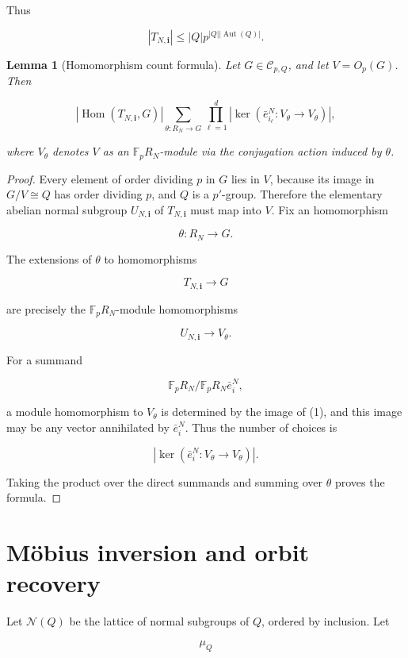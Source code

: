 \documentclass[11pt]{article}
\newtheorem{lemma}[theorem]{Lemma}
\begin{document}
Thus

\[
|T_{N,\mathbf i}|
\le
|Q|p^{|Q||\operatorname{Aut}(Q)|}.
\]

\begin{lemma}[Homomorphism count formula]
Let $G\in\mathcal C_{p,Q}$, and let $V=O_p(G)$. Then

\[
|\operatorname{Hom}(T_{N,\mathbf i},G)|
\sum_{\theta:R_N\to G}
\prod_{\ell=1}^d
\left|
\ker\left(
\bar e_{i_\ell}^N:V_\theta\to V_\theta
\right)
\right|,
\]

where $V_\theta$ denotes $V$ as an $\mathbb F_pR_N$-module via the conjugation action induced by $\theta$.

\end{lemma}

\begin{proof}
Every element of order dividing $p$ in $G$ lies in $V$, because its image in $G/V\cong Q$ has order dividing $p$, and $Q$ is a $p'$-group. Therefore the elementary abelian normal subgroup $U_{N,\mathbf i}$ of $T_{N,\mathbf i}$ must map into $V$. Fix an homomorphism

\[
\theta:R_N\to G.
\]

The extensions of $\theta$ to homomorphisms

\[
T_{N,\mathbf i}\to G
\]

are precisely the $\mathbb F_pR_N$-module homomorphisms

\[
U_{N,\mathbf i}\to V_\theta.
\]

For a summand

\[
\mathbb F_pR_N/\mathbb F_pR_N\bar e_i^N,
\]

a module homomorphism to $V_\theta$ is determined by the image of (1), and this image may be any vector annihilated by $\bar e_i^N$. Thus the number of choices is

\[
|\ker(\bar e_i^N:V_\theta\to V_\theta)|.
\]

Taking the product over the direct summands and summing over $\theta$ proves the formula.

\end{proof}

\section{Möbius inversion and orbit recovery}

Let $\mathcal N(Q)$ be the lattice of normal subgroups of $Q$, ordered by inclusion. Let

\[
\mu_Q
\]
\end{document}
